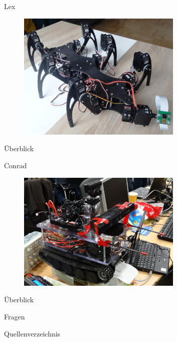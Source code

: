 \documentclass{beamer}
\begin{document}
\begin{frame}{Lex}
 \begin{figure}[H]
  \centering
  \includegraphics[width=0.7\textwidth]{./images/robot-lex.jpg}
 \end{figure}
\end{frame}
\begin{frame}{\"Uberblick}

\end{frame}
\begin{frame}{Conrad}
 \begin{figure}[H]
  \centering
  \includegraphics[width=0.7\textwidth]{./images/robot-conrad.jpg}
 \end{figure}
\end{frame}
\begin{frame}{\"Uberblick}

\end{frame}
\begin{frame}
	\Huge{\centerline{Fragen}}
\end{frame}
\begin{frame}[allowframebreaks]{Quellenverzeichnis}
\scriptsize{}
\end{frame}
\end{document}
